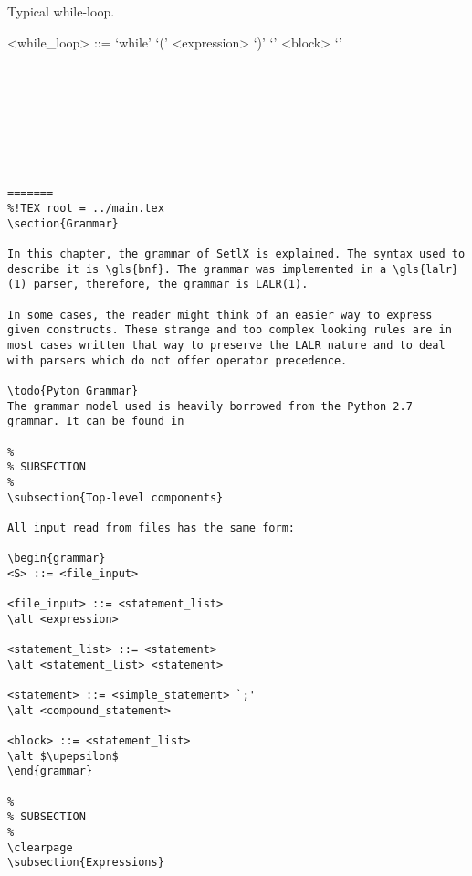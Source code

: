 Typical while-loop.

\begin{grammar}
<while_loop> ::= `while' `(' <expression> `)' `{' <block> `}'
\end{grammar}

\clearpage

\begin{verbatim}








=======
%!TEX root = ../main.tex
\section{Grammar}

In this chapter, the grammar of SetlX is explained. The syntax used to describe it is \gls{bnf}. The grammar was implemented in a \gls{lalr}(1) parser, therefore, the grammar is LALR(1). 

In some cases, the reader might think of an easier way to express given constructs. These strange and too complex looking rules are in most cases written that way to preserve the LALR nature and to deal with parsers which do not offer operator precedence.

\todo{Pyton Grammar}
The grammar model used is heavily borrowed from the Python 2.7 grammar. It can be found in 

%
% SUBSECTION
%
\subsection{Top-level components}

All input read from files has the same form:

\begin{grammar}
<S> ::= <file_input>

<file_input> ::= <statement_list>
\alt <expression>

<statement_list> ::= <statement>
\alt <statement_list> <statement>

<statement> ::= <simple_statement> `;'
\alt <compound_statement>

<block> ::= <statement_list>
\alt $\upepsilon$
\end{grammar}

%
% SUBSECTION
%
\clearpage
\subsection{Expressions}


\end{verbatim}
